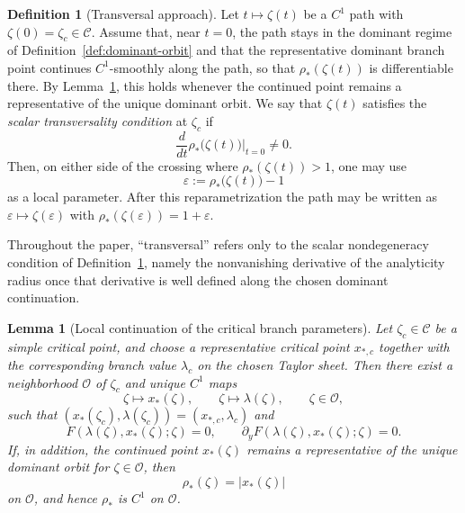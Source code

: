 \documentclass[11pt]{amsart}
\numberwithin{equation}{section}
\theoremstyle{plain}
\newtheorem{lemma}[theorem]{Lemma}
\theoremstyle{definition}
\newtheorem{definition}[theorem]{Definition}
\theoremstyle{remark}
\begin{document}
\begin{definition}[Transversal approach]\label{def:transversal-path}
	Let $t\mapsto\zeta(t)$ be a $C^1$ path with $\zeta(0)=\zeta_c\in\mathcal C$.
	Assume that, near $t=0$, the path stays in the dominant regime of
	Definition~\ref{def:dominant-orbit} and that the representative dominant
	branch point continues $C^1$-smoothly along the path, so that
	$\rho_*(\zeta(t))$ is differentiable there. By
	Lemma~\ref{lem:local-branch-data}, this holds whenever the continued point
	remains a representative of the unique dominant orbit.
	We say that $\zeta(t)$ satisfies the \emph{scalar transversality condition} at
	$\zeta_c$ if
	\[
	\frac{d}{dt}\rho_*\bigl(\zeta(t)\bigr)\Big|_{t=0}\neq0.
	\]
	Then, on either side of the crossing where $\rho_*(\zeta(t))>1$, one may use
	\[
		\varepsilon:=\rho_*\bigl(\zeta(t)\bigr)-1
	\]
	as a local parameter. After this reparametrization the path may be written as
	$\varepsilon\mapsto\zeta(\varepsilon)$ with
	$\rho_*(\zeta(\varepsilon))=1+\varepsilon$.
\end{definition}


Throughout the paper, ``transversal'' refers only to the scalar
nondegeneracy condition of Definition~\ref{def:transversal-path}, namely the
nonvanishing derivative of the analyticity radius once that derivative is
well defined along the chosen dominant continuation.

\begin{lemma}[Local continuation of the critical branch parameters]
\label{lem:local-branch-data}
Let \(\zeta_c\in\mathcal C\) be a simple critical point, and choose a
representative critical point \(x_{*,c}\) together with the corresponding
branch value \(\lambda_c\) on the chosen Taylor sheet. Then there exist a
neighborhood \(\mathcal O\) of \(\zeta_c\) and unique \(C^1\) maps
\[
\zeta\mapsto x_*(\zeta),\qquad
\zeta\mapsto \lambda(\zeta),\qquad
\zeta\in\mathcal O,
\]
such that \((x_*(\zeta_c),\lambda(\zeta_c))=(x_{*,c},\lambda_c)\) and
\[
F(\lambda(\zeta),x_*(\zeta);\zeta)=0,
\qquad
\partial_yF(\lambda(\zeta),x_*(\zeta);\zeta)=0.
\]
If, in addition, the continued point \(x_*(\zeta)\) remains a representative
of the unique dominant orbit for \(\zeta\in\mathcal O\), then
\[
\rho_*(\zeta)=|x_*(\zeta)|
\]
on \(\mathcal O\), and hence \(\rho_*\) is \(C^1\) on \(\mathcal O\).
\end{lemma}
\end{document}
